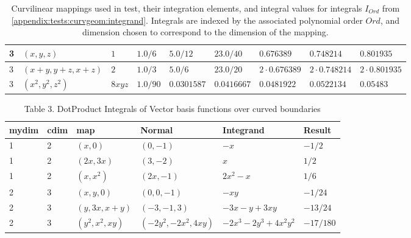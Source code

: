\begin{landscape}
\begin{table} [H]
\begin{tabular}{ | l | l | l | l | l | l | l | l | l |}
  3 & $(x,y,z)$            & $1$ & $1.0/6$ & $5.0/12$ & $23.0/40$ & $0.676389$ & $0.748214$ & $0.801935$ \\ \hline
  3 & $(x+y,y+z,x+z)$      & $2$ & $1.0/3$ & $5.0/6$ & $23.0/20$ & $2\cdot 0.676389$ & $2\cdot 0.748214$ & $2\cdot 0.801935$ \\ \hline
  3 & $(x^2,y^2,z^2)$      & $8xyz$ & $1.0/90$ & $0.0301587$ & $0.0416667$ & $0.0481922$ & $0.0522134$ & $0.05483$ \\ \hline
\end{tabular} %
\caption{Curvilinear mappings used in \curvgeom{} test, their integration elements, and integral values for integrals $I_{Ord}$ from  \cref{appendix:tests:curvgeom:integrand}. Integrals are indexed by the associated polynomial order $Ord$, and dimension chosen to correspond to the dimension of the mapping.}
\label{appendix:tests:curvgeom:mappings}
\end{table}

\end{landscape}


\begin{table}
\centering
\begin{tabular}{ | l | l | l | l | l | l | }
  \hline
  mydim & cdim & map               & Normal                  & Integrand                  & Result     \\ \hline
  1     & 2    & $(x,0)$           & $(0,-1)$                & $-x$                       & $-1/2$     \\ \hline
  1     & 2    & $(2x,3x)$         & $(3,-2)$                & $x$                        & $1/2$      \\ \hline
  1     & 2    & $(x,x^2)$         & $(2x,-1)$               & $2x^2-x$                   & $1/6$      \\ \hline
  2     & 3    & $(x,y,0)$         & $(0,0,-1)$              & $-xy$                      & $-1/24$    \\ \hline
  2     & 3    & $(y,3x,x+y)$      & $(-3,-1,3)$             & $-3x-y+3xy$                & $-13/24$   \\ \hline
  2     & 3    & $(y^2,x^2,xy)$    & $(-2y^2,-2x^2,4xy)$     & $-2x^3-2y^3+4x^2y^2$      & $-17/180$   \\ \hline
\end{tabular}
\caption{Table 3. DotProduct Integrals of Vector basis functions over curved boundaries}
\label{appendix:tests:curvgeom:dotproductintegral}
\end{table}